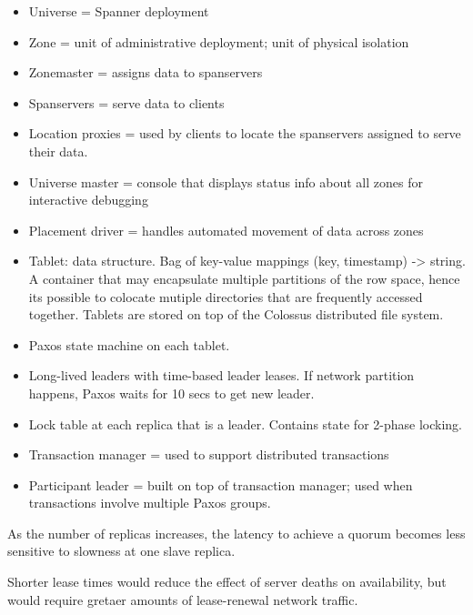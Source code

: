 \begin{itemize}
    \item Universe = Spanner deployment
    \item Zone = unit of administrative deployment; unit of physical isolation
    \item Zonemaster = assigns data to spanservers
    \item Spanservers = serve data to clients
    \item Location proxies = used by clients to locate the spanservers assigned to serve their data.
    \item Universe master = console that displays status info about all zones for interactive debugging
    \item Placement driver = handles automated movement of data across zones
    \item Tablet: data structure. Bag of key-value mappings (key, timestamp) -> string. A container that may encapsulate multiple partitions of the row space, hence its possible to colocate mutiple directories that are frequently accessed together. Tablets are stored on top of the Colossus distributed file system. 
    \item Paxos state machine on each tablet.
    \item Long-lived leaders with time-based leader leases. If network partition happens, Paxos waits for 10 secs to get new leader. 
    \item Lock table at each replica that is a leader. Contains state for 2-phase locking.
    \item Transaction manager = used to support distributed transactions
    \item Participant leader = built on top of transaction manager; used when transactions involve multiple Paxos groups.
\end{itemize}

As the number of replicas increases, the latency to achieve a quorum becomes less sensitive to slowness at one slave replica.

Shorter lease times would reduce the effect of server deaths on availability, but would require gretaer amounts of lease-renewal network traffic.